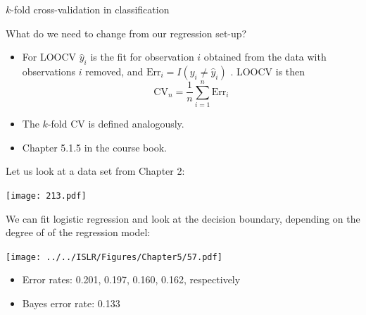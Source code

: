 \documentclass[
  10pt,
  ignorenonframetext,
]{beamer}
\providecommand{\tightlist}{%
  \setlength{\itemsep}{0pt}\setlength{\parskip}{0pt}}
\begin{document}
\begin{frame}
\begin{block}{\(k\)-fold cross-validation in classification}
\protect\hypertarget{k-fold-cross-validation-in-classification}{}
\vspace{3mm}

What do we need to change from our regression set-up?

\vspace{3mm}

\begin{itemize}
\tightlist
\item
  For LOOCV \(\hat{y}_i\) is the fit for observation \(i\) obtained from
  the data with observations \(i\) removed, and
  \({\text{Err}_i}=I(y_i\neq \hat{y}_i)\) . LOOCV is then
  \[\text{CV}_{n}=\frac{1}{n} \sum_{i=1}^n {\text{Err}_i}\]
\end{itemize}

\vspace{2mm}

\begin{itemize}
\tightlist
\item
  The \(k\)-fold CV is defined analogously.
\end{itemize}

\vspace{3mm}

\begin{itemize}
\tightlist
\item
  Chapter 5.1.5 in the course book.
\end{itemize}
\end{block}
\end{frame}

\begin{frame}
Let us look at a data set from Chapter 2:

\centering

\texttt{[image: 213.pdf]}
\end{frame}

\begin{frame}
We can fit logistic regression and look at the decision boundary,
depending on the degree of of the regression model:

\centering

\texttt{[image: ../../ISLR/Figures/Chapter5/57.pdf]}

\flushleft

\begin{itemize}
\tightlist
\item
  Error rates: 0.201, 0.197, 0.160, 0.162, respectively
\item
  Bayes error rate: 0.133
\end{itemize}
\end{frame}
\end{document}
